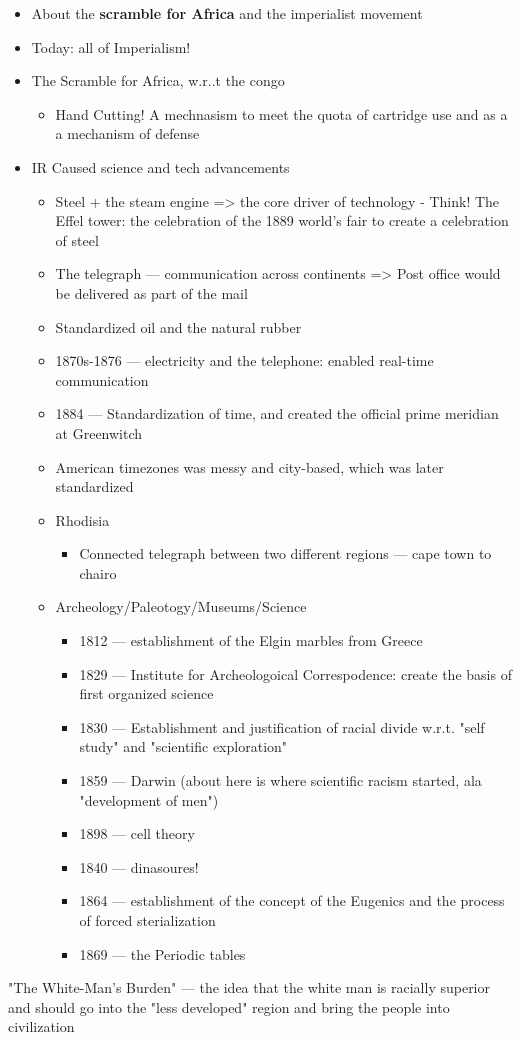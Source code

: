 \documentclass[letterpaper]{article}
\begin{document}
\begin{itemize}
\item About the \textbf{scramble for Africa} and the imperialist movement
\item Today: all of Imperialism!
\item The Scramble for Africa, w.r..t the congo

\begin{itemize}
\item Hand Cutting! A mechnasism to meet the quota of cartridge use and as
a a mechanism of defense
\end{itemize}

\item IR Caused science and tech advancements

\begin{itemize}
\item Steel + the steam engine => the core driver of technology - Think!
The Effel tower: the celebration of the 1889 world's fair to create
a celebration of steel
\item The telegraph --- communication across continents => Post office
would be delivered as part of the mail
\item Standardized oil and the natural rubber
\item 1870s-1876 --- electricity and the telephone: enabled real-time
communication
\item 1884 --- Standardization of time, and created the official prime
meridian at Greenwitch
\item American timezones was messy and city-based, which was later
standardized
\item Rhodisia

\begin{itemize}
\item Connected telegraph between two different regions --- cape town to
chairo
\end{itemize}

\item Archeology/Paleotogy/Museums/Science

\begin{itemize}
\item 1812 --- establishment of the Elgin marbles from Greece
\item 1829 --- Institute for Archeologoical Correspodence: create the
basis of first organized science
\item 1830 --- Establishment and justification of racial divide w.r.t.
"self study" and "scientific exploration"
\item 1859 --- Darwin (about here is where scientific racism started,
ala "development of men")
\item 1898 --- cell theory
\item 1840 --- dinasoures!
\item 1864 --- establishment of the concept of the Eugenics and the
process of forced sterialization
\item 1869 --- the Periodic tables
\end{itemize}
\end{itemize}
\end{itemize}

"The White-Man's Burden" --- the idea that the white man is racially
superior and should go into the "less developed" region and bring the
people into civilization
\end{document}

